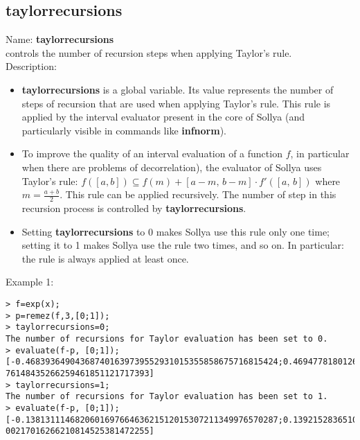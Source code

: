 \subsection{taylorrecursions}
\label{labtaylorrecursions}
\noindent Name: \textbf{taylorrecursions}\\
controls the number of recursion steps when applying Taylor's rule.\\

\noindent Description: \begin{itemize}

\item \textbf{taylorrecursions} is a global variable. Its value represents the number of steps
   of recursion that are used when applying Taylor's rule. This rule is applied
   by the interval evaluator present in the core of Sollya (and particularly
   visible in commands like \textbf{infnorm}).

\item To improve the quality of an interval evaluation of a function $f$, in 
   particular when there are problems of decorrelation), the evaluator of Sollya
   uses Taylor's rule:  $f([a,b]) \subseteq f(m) + [a-m,\,b-m] \cdot f'([a,\,b])$ where $m=\frac{a+b}{2}$.
   This rule can be applied recursively.
   The number of step in this recursion process is controlled by \textbf{taylorrecursions}.

\item Setting \textbf{taylorrecursions} to 0 makes Sollya use this rule only one time;
   setting it to 1 makes Sollya use the rule two times, and so on.
   In particular: the rule is always applied at least once.
\end{itemize}
\noindent Example 1: 
\begin{center}\begin{minipage}{15cm}\begin{Verbatim}[frame=single]
> f=exp(x);
> p=remez(f,3,[0;1]);
> taylorrecursions=0;
The number of recursions for Taylor evaluation has been set to 0.
> evaluate(f-p, [0;1]);
[-0.468393649043687401639739552931015355858675716815424;0.4694778180126977487653
76148435266259461851121717393]
> taylorrecursions=1;
The number of recursions for Taylor evaluation has been set to 1.
> evaluate(f-p, [0;1]);
[-0.138131114682060169766463621512015307211349976570287;0.1392152836510705168921
00217016266210814525381472255]
\end{Verbatim}
\end{minipage}\end{center}
